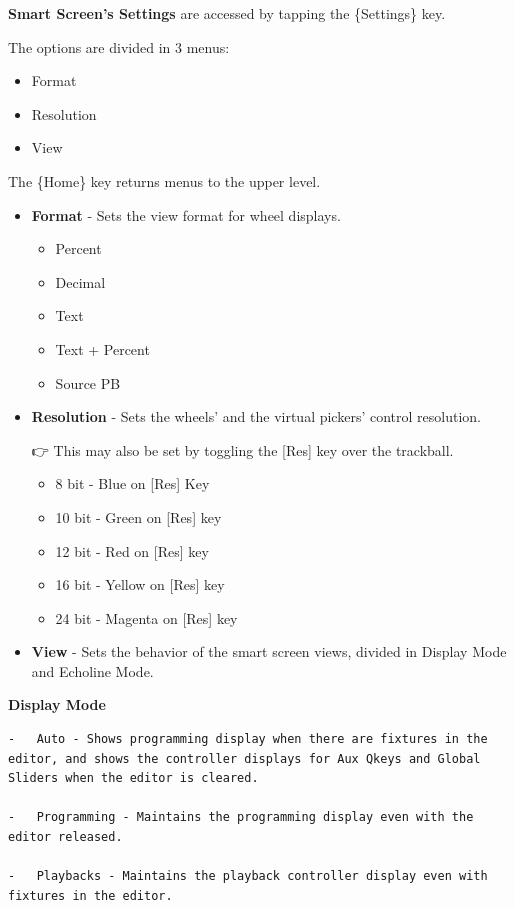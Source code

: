 \documentclass[
]{article}
\begin{document}
\textbf{Smart Screen's Settings} are accessed by tapping the \{Settings\} key.

The options are divided in 3 menus:

\begin{itemize}
\item
  Format
\item
  Resolution
\item
  View
\end{itemize}

The \{Home\} key returns menus to the upper level.

\begin{itemize}
\item
  \textbf{Format} - Sets the view format for wheel displays.

  \begin{itemize}
  \item
    Percent
  \item
    Decimal
  \item
    Text
  \item
    Text + Percent
  \item
    Source PB
  \end{itemize}
\item
  \textbf{Resolution} - Sets the wheels' and the virtual pickers' control resolution.

  👉 This may also be set by toggling the {[}Res{]} key over the trackball.

  \begin{itemize}
  \item
    8 bit - Blue on {[}Res{]} Key
  \item
    10 bit - Green on {[}Res{]} key
  \item
    12 bit - Red on {[}Res{]} key
  \item
    16 bit - Yellow on {[}Res{]} key
  \item
    24 bit - Magenta on {[}Res{]} key
  \end{itemize}
\item
  \textbf{View} - Sets the behavior of the smart screen views, divided in Display Mode and Echoline Mode.
\end{itemize}

\textbf{Display Mode}

\begin{verbatim}
-   Auto - Shows programming display when there are fixtures in the editor, and shows the controller displays for Aux Qkeys and Global Sliders when the editor is cleared. 

-   Programming - Maintains the programming display even with the editor released. 

-   Playbacks - Maintains the playback controller display even with fixtures in the editor.
\end{verbatim}
\end{document}
